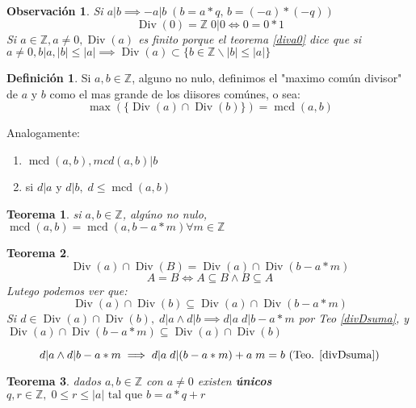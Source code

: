 \documentclass[9pt,a4paper,draft]{article}
\theoremstyle{definition}
\newtheorem{defi}{Definición}
\theoremstyle{plain}
\newtheorem{teo}{Teorema}
\newtheorem{obs}{Observación}
\DeclareMathOperator{\Div}{Div}
\DeclareMathOperator{\mcd}{mcd}
\begin{document}
\begin{obs} Si $a|b \implies -a|b \; (b=a*q,\, b=(-a)*(-q))$ \\ $$\Div(0) = \mathbb{Z} \; 0|0 \iff 0=0*1$$
Si $a\in{\mathbb{Z}}, a\neq{0}, \Div(a)$ es finito porque el teorema \ref{diva0} dice que si $a\neq{0}, b|a, |b|\leq|a|\implies \Div(a)\subset \{b\in{\mathbb{Z}} \backslash |b|\leq|a|\}$
\end{obs}

\begin{defi} Si $a,b\in{\mathbb{Z}}$, alguno no nulo, definimos el "maximo común divisor" de $a$ y $b$ como  el mas grande de los diisores comúnes, o sea:
$$\operatorname{max}(\{\Div(a)\cap\Div(b)\}) = \mcd(a,b)$$

Analogamente:

\begin{enumerate}
\item $\mcd(a,b), mcd(a,b)|b$
\item si $d|a$ y $d|b,\; d\leq{\mcd(a,b)}$
\end{enumerate}
\end{defi}

\begin{teo} si $a,b\in{\mathbb{Z}}$, algúno no nulo, $\mcd(a,b) = \mcd(a, b-a*m)\forall m\in{\mathbb{Z}}$\end{teo}

\begin{teo} $$\Div(a)\cap\Div(B)=\Div(a)\cap\Div(b-a*m)$$
$$A=B \iff A\subseteq{B} \land B\subseteq{A}$$
Lutego podemos ver que:
$$\Div(a)\cap\Div(b) \subseteq \Div(a)\cap\Div(b-a*m)$$
Si $d\in{\Div(a)\cap\Div(b)},\; d|a \land d|b \implies d|a\; d|b-a*m$ por Teo \ref{divDsuma}, y $\Div(a)\cap\Div(b-a*m)\subseteq\Div(a)\cap\Div(b)$

$$d|a \land d|b-a*m \implies d|a\;d|(b-a*m)+a\;m=b \text{ (Teo. \ref{divDsuma})}$$
\end{teo}

\begin{teo} dados $a,b\in{\mathbb{Z}}$ con $a\neq{0}$ existen {\bfseries únicos} $q,r\in{\mathbb{Z}},\; 0\leq{r}\leq{|a|}\text{ tal que } b=a*q+r$ \end{teo}
\end{document}
